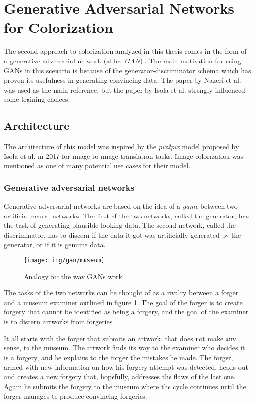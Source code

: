 \clearpage
\section{Generative Adversarial Networks for Colorization}
\label{sec:gan}

The second approach to colorization analyzed in this thesis comes in the form
of a generative adversarial network (abbr. \textit{GAN}) \citep{goodfellow2014generative}.
The main motivation for using GANs in this scenario is because of the 
generator-discriminator schema which has proven its usefulness in generating 
convincing data. The paper by Nazeri et al. was used as the main reference, 
but the paper by Isola et al. strongly influenced some training choices.

\subsection{Architecture}

The architecture of this model was inspired by the \textit{pix2pix} model proposed
by Isola et al. in 2017 for image-to-image translation tasks. Image colorization
was mentioned as one of many potential use cases for their model.

\subsubsection{Generative adversarial networks}

Generative adversarial networks are based on the idea of a \textit{game} between
two artificial neural networks. The first of the two networks, called the generator, 
has the task of generating plausible-looking data. The second network, called the
discriminator, has to discern if the data it got was artificially generated by the
generator, or if it is genuine data.

\begin{figure}[!ht]
	\centering
	\texttt{[image: img/gan/museum]}
    \caption{Analogy for the way GANs work}
	\label{fig:museum}
\end{figure}

The tasks of the two networks can be thought of as a rivalry between a forger
and a museum examiner outlined in figure \ref{fig:museum}. The goal of the forger
is to create forgery that cannot be identified as being a forgery, and the goal 
of the examiner is to discern artworks from forgeries.

It all starts with the forger that submits an artwork, that does not make any 
sense, to the museum. The artwork finds its way to the examiner who decides 
it is a forgery, and he explains to the forger the mistakes he made.
The forger, armed with new information on how his forgery attempt was detected, 
heads out and creates a new forgery that, hopefully, addresses the flaws of the
last one. Again he submits the forgery to the museum where the cycle continues
until the forger manages to produce convincing forgeries.

